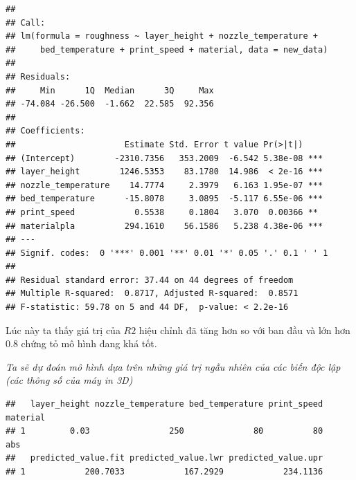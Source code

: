 \begin{verbatim}
## 
## Call:
## lm(formula = roughness ~ layer_height + nozzle_temperature + 
##     bed_temperature + print_speed + material, data = new_data)
## 
## Residuals:
##     Min      1Q  Median      3Q     Max 
## -74.084 -26.500  -1.662  22.585  92.356 
## 
## Coefficients:
##                      Estimate Std. Error t value Pr(>|t|)    
## (Intercept)        -2310.7356   353.2009  -6.542 5.38e-08 ***
## layer_height        1246.5353    83.1780  14.986  < 2e-16 ***
## nozzle_temperature    14.7774     2.3979   6.163 1.95e-07 ***
## bed_temperature      -15.8078     3.0895  -5.117 6.55e-06 ***
## print_speed            0.5538     0.1804   3.070  0.00366 ** 
## materialpla          294.1610    56.1586   5.238 4.38e-06 ***
## ---
## Signif. codes:  0 '***' 0.001 '**' 0.01 '*' 0.05 '.' 0.1 ' ' 1
## 
## Residual standard error: 37.44 on 44 degrees of freedom
## Multiple R-squared:  0.8717, Adjusted R-squared:  0.8571 
## F-statistic: 59.78 on 5 and 44 DF,  p-value: < 2.2e-16
\end{verbatim}

Lúc này ta thấy giá trị của \(R2\) hiệu chỉnh đã tăng hơn so với ban đầu
và lớn hơn 0.8 chứng tỏ mô hình đang khá tốt.

\emph{Ta sẽ dự đoán mô hình dựa trên những giá trị ngẫu nhiên của các
biến độc lập (các thông số của máy in 3D) }

\begin{Shaded}
\begin{Highlighting}[]
\OtherTok{\textless{}{-}} \NormalTok{(} \NormalTok{, } \NormalTok{, }
 \NormalTok{, } \NormalTok{, } \NormalTok{)}
\SpecialCharTok{$}\OtherTok{\textless{}{-}} 
 \NormalTok{, } \NormalTok{)}
\end{Highlighting}
\end{Shaded}

\begin{verbatim}
##   layer_height nozzle_temperature bed_temperature print_speed material
## 1         0.03                250              80          80      abs
##   predicted_value.fit predicted_value.lwr predicted_value.upr
## 1            200.7033            167.2929            234.1136
\end{verbatim}

